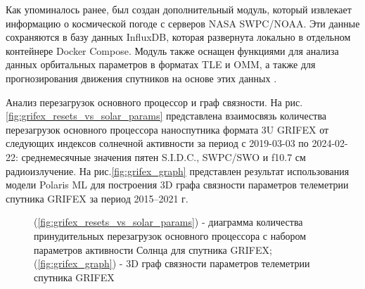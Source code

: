 ﻿\documentclass[14pt, a4paper]{extreport}
\begin{document}
Как упоминалось ранее, был создан дополнительный модуль, который извлекает информацию о космической погоде с серверов NASA SWPC/NOAA. Эти данные сохраняются в базу данных InfluxDB, которая развернута локально в отдельном контейнере Docker Compose. Модуль также оснащен функциями для анализа данных орбитальных параметров в форматах TLE и OMM, а также для прогнозирования движения спутников на основе этих данных \cite{bottou1991stochastic}\cite{killick2012optimal}.

Анализ перезагрузок основного процессор и граф связности. На рис.\ref{fig:grifex_resets_vs_solar_params} представлена взаимосвязь количества перезагрузок основного процессора наноспутника формата 3U GRIFEX от следующих индексов солнечной активности за период с 2019-03-03 по 2024-02-22: среднемесячные значения пятен S.I.D.C., SWPC/SWO и f10.7 см радиоизлучение. На рис.\ref{fig:grifex_graph} представлен результат использования модели Polaris ML для построения 3D графа связности параметров телеметрии спутника GRIFEX за период 2015–2021 г.

\begin{figure}[htbp]
	\centering
	\hfill %
	\caption{(\ref{fig:grifex_resets_vs_solar_params}) - диаграмма количества принудительных перезагрузок основного процессора с набором параметров активности Солнца для спутника GRIFEX; (\ref{fig:grifex_graph}) - 3D граф связности параметров телеметрии спутника GRIFEX}
	\label{fig:combined_figure}
\end{figure}
\end{document}
